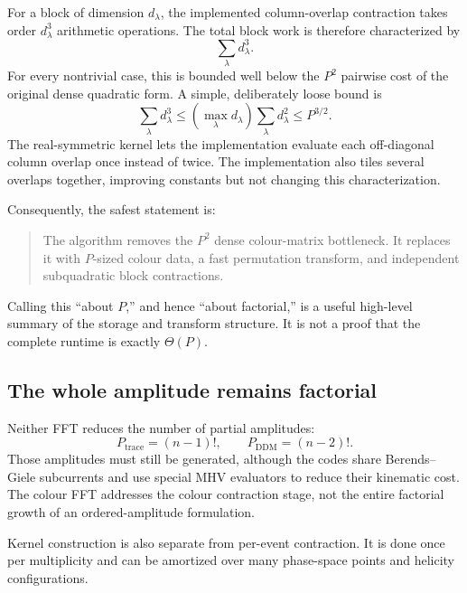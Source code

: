 \documentclass[11pt,a4paper]{article}
\begin{document}
For a block of dimension $d_\lambda$, the implemented column-overlap
contraction takes order $d_\lambda^3$ arithmetic operations.  The total
block work is therefore characterized by
\begin{equation}
  \sum_\lambda d_\lambda^3.
  \label{eq:block-cost}
\end{equation}
For every nontrivial case, this is bounded well below the $P^2$ pairwise cost
of the original dense quadratic form.  A simple, deliberately loose bound is
\begin{equation}
  \sum_\lambda d_\lambda^3
  \leq
  \left(\max_\lambda d_\lambda\right)
  \sum_\lambda d_\lambda^2
  \leq P^{3/2}.
  \label{eq:block-bound}
\end{equation}
The real-symmetric kernel lets the implementation evaluate each off-diagonal
column overlap once instead of twice.  The implementation also tiles several
overlaps together, improving constants but not changing this characterization.

Consequently, the safest statement is:
\begin{quote}
The algorithm removes the $P^2$ dense colour-matrix bottleneck.  It replaces
it with $P$-sized colour data, a fast permutation transform, and independent
subquadratic block contractions.
\end{quote}
Calling this ``about $P$,'' and hence ``about factorial,'' is a useful
high-level summary of the storage and transform structure.  It is not a proof
that the complete runtime is exactly $\Theta(P)$.

\subsection{The whole amplitude remains factorial}

Neither FFT reduces the number of partial amplitudes:
\begin{equation}
  P_{\mathrm{trace}}=(n-1)!,
  \qquad
  P_{\mathrm{DDM}}=(n-2)!.
\end{equation}
Those amplitudes must still be generated, although the codes share
Berends--Giele subcurrents and use special MHV evaluators to reduce their
kinematic cost.  The colour FFT addresses the colour contraction stage, not
the entire factorial growth of an ordered-amplitude formulation.

Kernel construction is also separate from per-event contraction.  It is done
once per multiplicity and can be amortized over many phase-space points and
helicity configurations.
\end{document}
